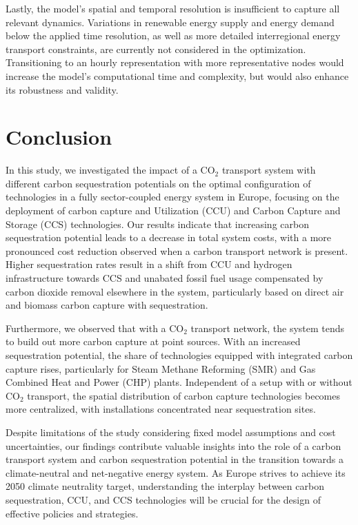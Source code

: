 \documentclass[conference]{IEEEtran}
\newcommand{\carbon}{CO$_2$ }
\begin{document}
Lastly, the model's spatial and temporal resolution is insufficient to capture all relevant dynamics. Variations in renewable energy supply and energy demand below the applied time resolution, as well as more detailed interregional energy transport constraints, are currently not considered in the optimization. Transitioning to an hourly representation with more representative nodes would increase the model's computational time and complexity, but would also enhance its robustness and validity.

\section{Conclusion}
\label{sec:conclusion}

In this study, we investigated the impact of a \carbon transport system with different carbon sequestration potentials on the optimal configuration of technologies in a fully sector-coupled energy system in Europe, focusing on the deployment of carbon capture and Utilization (CCU) and Carbon Capture and Storage (CCS) technologies. Our results indicate that increasing carbon sequestration potential leads to a decrease in total system costs, with a more pronounced cost reduction observed when a carbon transport network is present. Higher sequestration rates result in a shift from CCU and hydrogen infrastructure towards CCS and unabated fossil fuel usage compensated by carbon dioxide removal elsewhere in the system, particularly based on direct air and biomass carbon capture with sequestration.

Furthermore, we observed that with a \carbon transport network, the system tends to build out more carbon capture at point sources. With an increased sequestration potential, the share of technologies equipped with integrated carbon capture rises, particularly for Steam Methane Reforming (SMR) and Gas Combined Heat and Power (CHP) plants. Independent of a setup with or without \carbon transport, the spatial distribution of carbon capture technologies becomes more centralized, with installations concentrated near sequestration sites.

Despite limitations of the study considering fixed model assumptions and cost uncertainties, our findings contribute valuable insights into the role of a carbon transport system and carbon sequestration potential in the transition towards a climate-neutral and net-negative energy system. As Europe strives to achieve its 2050 climate neutrality target, understanding the interplay between carbon sequestration, CCU, and CCS technologies will be crucial for the design of effective policies and strategies.
\end{document}
